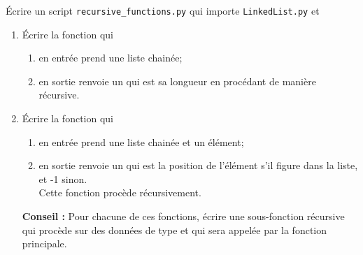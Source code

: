 \documentclass[a4paper,12pt,french]{article}
\begin{document}
\begin{exercice}
\'Ecrire un script \texttt{recursive\_functions.py} qui importe \texttt{LinkedList.py} et
\begin{enumerate}[\bfseries 1.]
    \item \'Ecrire la fonction  qui
    \begin{enumerate}[--]
        \item en entrée prend une liste chainée;
        \item en sortie renvoie un  qui est sa longueur en procédant de manière récursive.
    \end{enumerate}
    \item \'Ecrire la fonction  qui
    \begin{enumerate}[--]
    \item en entrée prend une liste chainée et un élément;
    \item en sortie renvoie un  qui est la position de l'élément s'il figure dans la liste, et -1 sinon.\\
            Cette fonction procède récursivement.
\end{enumerate}
\textbf{Conseil :} Pour chacune de ces fonctions, écrire une sous-fonction récursive qui procède sur des données de type  et qui sera appelée par la fonction principale.
\end{enumerate}
\end{exercice}
\end{document}
